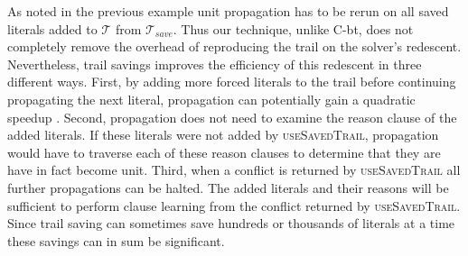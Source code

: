 \documentclass[runningheads]{llncs}
\renewcommand{\note}[1]{{\color{red}{#1}}}
\newcommand{\trail}{\ensuremath{\mathcal{T}}}
\newcommand{\cbt}{C-bt\xspace}
\newcommand{\trailsave}{\trail_{\mathit{save}}}
\newcommand{\ust}{\textsc{useSavedTrail}\xspace}
\begin{document}
As noted in the previous example unit propagation has to be rerun on
all saved literals added to $\trail$ from $\trailsave$. Thus our
technique, unlike \cbt, does not completely remove the overhead of
reproducing the trail on the solver's redescent. Nevertheless, trail
savings improves the efficiency of this redescent in three different
ways. First, by adding more forced literals to the trail before
continuing propagating the next literal, propagation can potentially
gain a quadratic speedup
\cite{DBLP:conf/sat/HickeyB19,DBLP:journals/jair/Gent13}. Second,
propagation does not need to examine the reason clause of the added
literals. If these literals were not added by \ust, propagation would
have to traverse each of these reason clauses to determine that they
are have in fact become unit. Third, when a conflict is returned by
\ust all further propagations can be halted. The added literals and
their reasons will be sufficient to perform clause learning from the
conflict returned by \ust. Since trail saving can sometimes save
hundreds or thousands of literals at a time these savings can in sum
be significant.

\end{document}
